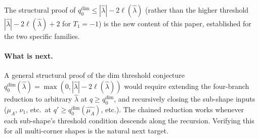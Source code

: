 \documentclass[11pt]{article}
\theoremstyle{definition}
\begin{document}
The structural proof of $q_0^{\dim} \le |\widehat\lambda| - 2\ell(\widehat\lambda)$
(rather than the higher threshold $|\widehat\lambda| - 2\ell(\widehat\lambda) + 2$
for $T_1 = -1$) is the new content of this paper, established for the
two specific families.

\paragraph{What is next.}
A general structural proof of the dim threshold conjecture
$q_0^{\dim}(\widehat\lambda) = \max(0, |\widehat\lambda| - 2\ell(\widehat\lambda))$
would require extending the four-branch reduction to arbitrary
$\widehat\lambda$ at $q \ge q_0^{\dim}$, and recursively closing the
sub-shape inputs ($\mu_A$, $\nu_1$, etc.\ at $q' \ge q_0^{\dim}(\widehat{\mu_A})$,
etc.). The chained reduction works whenever each sub-shape's threshold
condition descends along the recursion. Verifying this for all
multi-corner shapes is the natural next target.
\end{document}
